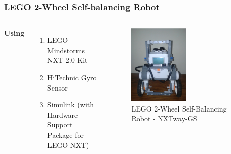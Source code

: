 \documentclass[aspectratio=169]{beamer}
\begin{document}
\begin{frame}
\frametitle{LEGO 2-Wheel Self-balancing Robot}
\begin{columns}[c] %

\textbf{Using}
\begin{enumerate}
\item LEGO Mindstorms NXT 2.0 Kit
\item HiTechnic Gyro Sensor
\item Simulink (with Hardware Support Package for LEGO NXT)
\end{enumerate}

\begin{figure}
	\includegraphics[width=0.5\textwidth]{legoBot.eps}
	\caption{LEGO 2-Wheel Self-Balancing Robot - NXTway-GS}
\end{figure}
\end{columns}
\end{frame}

\end{document}
